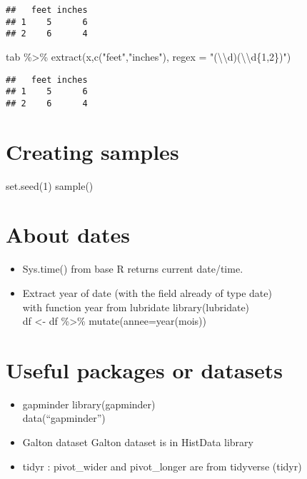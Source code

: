 \documentclass[
]{book}
\newenvironment{Shaded}{\begin{snugshade}}{\end{snugshade}}
\newcommand{\AttributeTok}[1]{\textcolor[rgb]{0.77,0.63,0.00}{#1}}
\newcommand{\FunctionTok}[1]{\textcolor[rgb]{0.00,0.00,0.00}{#1}}
\newcommand{\NormalTok}[1]{#1}
\newcommand{\SpecialCharTok}[1]{\textcolor[rgb]{0.00,0.00,0.00}{#1}}
\newcommand{\StringTok}[1]{\textcolor[rgb]{0.31,0.60,0.02}{#1}}
\begin{document}
\begin{verbatim}
##   feet inches
## 1    5      6
## 2    6      4
\end{verbatim}

\begin{Shaded}
\begin{Highlighting}[]
\NormalTok{tab }\SpecialCharTok{\%\textgreater{}\%} \FunctionTok{extract}\NormalTok{(x,}\FunctionTok{c}\NormalTok{(}\StringTok{"feet"}\NormalTok{,}\StringTok{"inches"}\NormalTok{), }\AttributeTok{regex =} \StringTok{"(}\SpecialCharTok{\textbackslash{}\textbackslash{}}\StringTok{d)\textquotesingle{}(}\SpecialCharTok{\textbackslash{}\textbackslash{}}\StringTok{d\{1,2\})"}\NormalTok{)}
\end{Highlighting}
\end{Shaded}

\begin{verbatim}
##   feet inches
## 1    5      6
## 2    6      4
\end{verbatim}

\hypertarget{creating-samples}{%
\section{Creating samples}\label{creating-samples}}

set.seed(1)
sample()

\hypertarget{about-dates}{%
\section{About dates}\label{about-dates}}

\begin{itemize}
\item
  Sys.time() from base R returns current date/time.
\item
  Extract year of date (with the field already of type date)\\
  with function year from lubridate
  library(lubridate)\\
  df \textless- df \%\textgreater\% mutate(annee=year(mois))
\end{itemize}

\hypertarget{useful-packages-or-datasets}{%
\section{Useful packages or datasets}\label{useful-packages-or-datasets}}

\begin{itemize}
\item
  gapminder
  library(gapminder)\\
  data(``gapminder'')
\item
  Galton dataset
  Galton dataset is in HistData library
\item
  tidyr :
  pivot\_wider and pivot\_longer are from tidyverse (tidyr)
\end{itemize}
\end{document}
